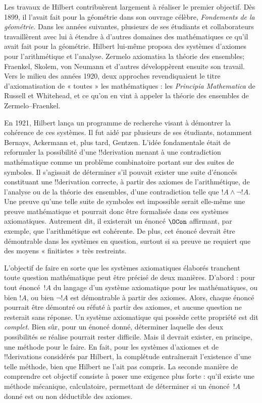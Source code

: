\documentclass[../../../include/open-logic-section]{subfiles}
\begin{document}
Les travaux de Hilbert contribuèrent largement à réaliser le premier
objectif. Dès 1899, il l'avait fait pour la géométrie dans son
ouvrage célèbre, \emph{Fondements de la géométrie}. Dans les années
suivantes, plusieurs de ses étudiants et collaborateurs travaillèrent
avec lui à étendre à d'autres domaines des mathématiques ce qu'il
avait fait pour la géométrie. Hilbert lui-même proposa des systèmes
d'axiomes pour l'arithmétique et l'analyse. Zermelo axiomatisa la
théorie des ensembles; Fraenkel, Skolem, von Neumann et d'autres
développèrent ensuite son travail. Vers le milieu des années 1920,
deux approches revendiquaient le titre d'axiomatisation de « toutes »
les mathématiques : les \emph{Principia Mathematica} de Russell et
Whitehead, et ce qu'on en vint à appeler la théorie des ensembles
de Zermelo--Fraenkel.

En 1921, Hilbert lança un programme de recherche visant à démontrer
la cohérence de ces systèmes. Il fut aidé par plusieurs de ses
étudiants, notamment Bernays, Ackermann et, plus tard, Gentzen.
L'idée fondamentale était de reformuler la possibilité d'une
!!{derivation} menant à une contradiction mathématique comme un
problème combinatoire portant sur des suites de symboles. Il
s'agissait de déterminer s'il pouvait exister une suite d'énoncés
constituant une !!{derivation} correcte, à partir des axiomes de
l'arithmétique, de l'analyse ou de la théorie des ensembles, d'une
contradiction telle que $!A \land \lnot !A$. Une preuve qu'une telle
suite de symboles est impossible serait elle-même une preuve
mathématique et pourrait donc être formalisée dans ces systèmes
axiomatiques. Autrement dit, il existerait un énoncé $\OCon$
affirmant, par exemple, que l'arithmétique est cohérente. De plus,
cet énoncé devrait être démontrable dans les systèmes en question,
surtout si sa preuve ne requiert que des moyens « finitistes » très
restreints.

L'objectif de faire en sorte que les systèmes
axiomatiques élaborés tranchent toute question mathématique peut
être précisé de deux manières. D'abord : pour tout énoncé~$!A$ du
langage d'un système axiomatique pour les mathématiques, ou bien
$!A$, ou bien $\lnot !A$ est démontrable à partir des axiomes.
Alors, chaque énoncé pourrait être démontré ou réfuté à partir
des axiomes, et aucune question ne resterait sans réponse.
Un système axiomatique qui possède cette propriété est dit
\emph{complet}. Bien sûr, pour un énoncé donné, déterminer
laquelle des deux possibilités se réalise pourrait rester difficile.
Mais il devrait exister, en principe, une méthode pour le faire.
En fait, pour les systèmes d'axiomes et de !!{derivation}s considérés
par Hilbert, la complétude entraînerait l'existence d'une telle
méthode, bien que Hilbert ne l'ait pas compris. La seconde manière
de comprendre cet objectif consiste à poser une exigence plus forte :
qu'il existe une méthode mécanique, calculatoire, permettant de
déterminer si un énoncé~$!A$ donné est ou non déductible des
axiomes.
\end{document}
